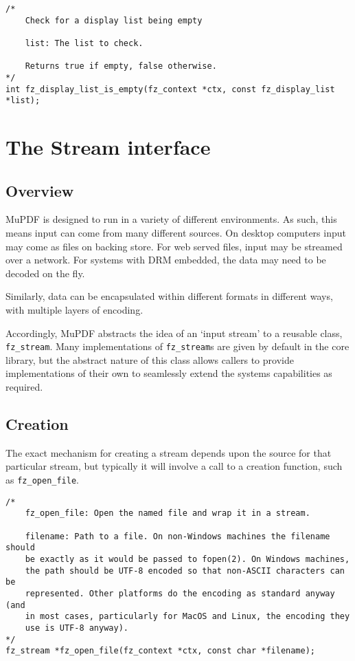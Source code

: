 \documentclass[oneside]{book}
\begin{document}
\begin{lstlisting}
/*
	Check for a display list being empty

	list: The list to check.

	Returns true if empty, false otherwise.
*/
int fz_display_list_is_empty(fz_context *ctx, const fz_display_list *list);
\end{lstlisting}

\chapter{The Stream interface}
\label{Stream}

\section{Overview}

MuPDF is designed to run in a variety of different environments. As such, this means input can come from many different sources. On desktop computers input may come as files on backing store. For web served files, input may be streamed over a network. For systems with DRM embedded, the data may need to be decoded on the fly.

Similarly, data can be encapsulated within different formats in different ways, with multiple layers of encoding.

Accordingly, MuPDF abstracts the idea of an `input stream' to a reusable class, \texttt{fz\_stream}. Many implementations of \texttt{fz\_stream}s are given by default in the core library, but the abstract nature of this class allows callers to provide implementations of their own to seamlessly extend the systems capabilities as required.

\section{Creation}

The exact mechanism for creating a stream depends upon the source for that particular stream, but typically it will involve a call to a creation function, such as \texttt{fz\_open\_file}.

\begin{lstlisting}
/*
	fz_open_file: Open the named file and wrap it in a stream.

	filename: Path to a file. On non-Windows machines the filename should
	be exactly as it would be passed to fopen(2). On Windows machines,
	the path should be UTF-8 encoded so that non-ASCII characters can be
	represented. Other platforms do the encoding as standard anyway (and
	in most cases, particularly for MacOS and Linux, the encoding they
	use is UTF-8 anyway).
*/
fz_stream *fz_open_file(fz_context *ctx, const char *filename);
\end{lstlisting}
\end{document}
